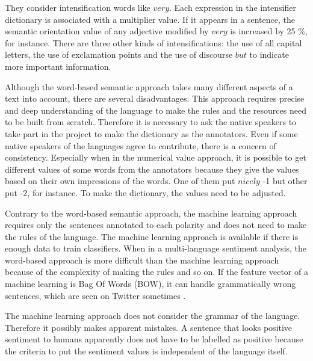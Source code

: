 They consider intensification words like $very$.
Each expression in the intensifier dictionary is associated with a multiplier value.
If it appears in a sentence, the semantic orientation value of any adjective modified by $very$ is increased by 25 \%, for instance. 
There are three other kinds of intensifications: the use of all capital letters, the use of exclamation points and the use of discourse $but$ to indicate more important information.

Although the word-based semantic approach takes many different aspects of a text into account, there are several disadvantages.
This approach requires precise and deep understanding of the language to make the rules and the resources need to be built from scratch.
Therefore it is necessary to ask the native speakers to take part in the project to make the dictionary as the annotators.
Even if some native speakers of the languages agree to contribute, there is a concern of consistency.
Especially when in the numerical value approach, it is possible to get different values of some words from the annotators because they give the values based on their own impressions of the words.
One of them put $nicely$ -1 but other put -2, for instance.
To make the dictionary, the values need to be adjusted.


Contrary to the word-based semantic approach, the machine learning approach requires only the sentences annotated to each polarity and does not need to make the rules of the language.
The machine learning approach is available if there is enough data to train classifiers.
When in a multi-language sentiment analysis, the word-based approach is more difficult than the machine learning approach because of the complexity of making the rules and so on.
If the feature vector of a machine learning is Bag Of Words (BOW), it can handle grammatically wrong sentences, which are seen on Twitter sometimes .


The machine learning approach does not consider the grammar of the language.
Therefore it possibly makes apparent mistakes.
A sentence that looks positive sentiment to humans apparently does not have to be labelled as positive because the criteria to put the sentiment values is independent of the language itself.


